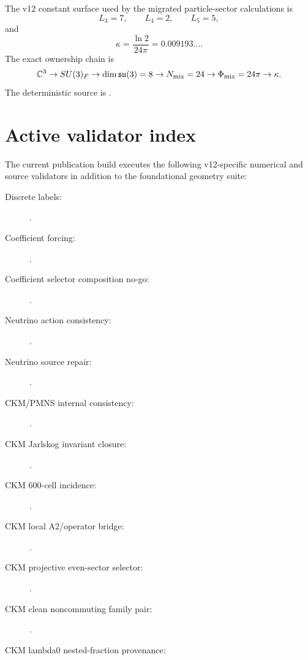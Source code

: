The v12 constant surface used by the migrated particle-sector calculations is
\[
L_3=7,\qquad L_4=2,\qquad L_5=5,
\]
and
\[
\boxed{
\kappa=\frac{\ln2}{24\pi}
=0.009193\ldots .
}
\]
The exact ownership chain is
\[
\mathbb C^3
\to SU(3)_F
\to \dim\mathfrak{su}(3)=8
\to N_{\rm mix}=24
\to\Phi_{\rm mix}=24\pi
\to\kappa.
\]
The deterministic source is
.

\section{Active validator index}

The current publication build executes the following v12-specific numerical and
source validators in addition to the foundational geometry suite:
\begin{description}
\item[Discrete labels:]
.
\item[Coefficient forcing:]
.
\item[Coefficient selector composition no-go:]
.
\item[Neutrino action consistency:]
.
\item[Neutrino source repair:]
.
\item[CKM/PMNS internal consistency:]
.
\item[CKM Jarlskog invariant closure:]
.
\item[CKM 600-cell incidence:]
.
\item[CKM local A2/operator bridge:]
.
\item[CKM projective even-sector selector:]
.
\item[CKM clean noncommuting family pair:]
.
\item[CKM lambda0 nested-fraction provenance:]

\end{description}
